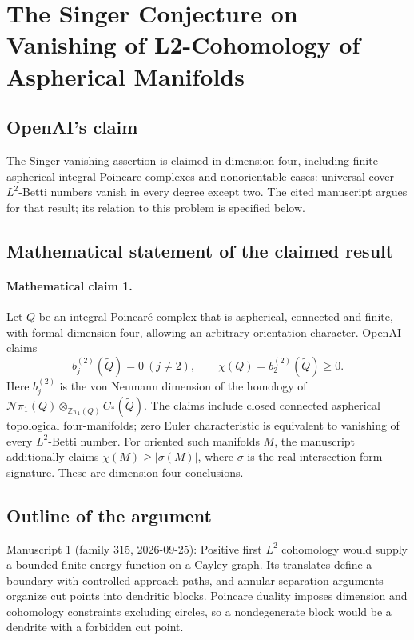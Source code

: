 \documentclass[11pt]{article}
\begin{document}
\section*{The Singer Conjecture on Vanishing of L2-Cohomology of Aspherical Manifolds}

\subsection{OpenAI's claim}
The Singer vanishing assertion is claimed in dimension four, including finite aspherical integral Poincare complexes and nonorientable cases: universal-cover \(L^2\)-Betti numbers vanish in every degree except two. The cited manuscript argues for that result; its relation to this problem is specified below.

\subsection{Mathematical statement of the claimed result}
\paragraph{Mathematical claim 1.} Let $Q$ be an integral Poincaré complex that is aspherical, connected and finite, with formal dimension four, allowing an arbitrary orientation character. OpenAI claims
\[
b_j^{(2)}(\widetilde Q)=0\ (j\ne2),\qquad
\chi(Q)=b_2^{(2)}(\widetilde Q)\ge0.
\]
Here $b_j^{(2)}$ is the von Neumann dimension of the homology of $\mathcal N\pi_1(Q)\otimes_{\mathbb Z\pi_1(Q)}C_*(\widetilde Q)$. The claims include closed connected aspherical topological four-manifolds; zero Euler characteristic is equivalent to vanishing of every $L^2$-Betti number. For oriented such manifolds $M$, the manuscript additionally claims $\chi(M)\ge|\sigma(M)|$, where $\sigma$ is the real intersection-form signature. These are dimension-four conclusions.

\subsection{Outline of the argument}
Manuscript 1 (family 315, 2026-09-25): Positive first \(L^2\) cohomology would supply a bounded finite-energy function on a Cayley graph. Its translates define a boundary with controlled approach paths, and annular separation arguments organize cut points into dendritic blocks. Poincare duality imposes dimension and cohomology constraints excluding circles, so a nondegenerate block would be a dendrite with a forbidden cut point.
\end{document}
